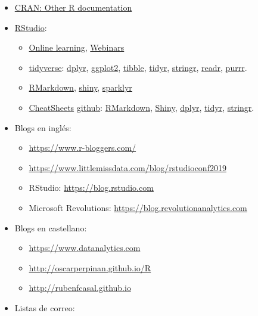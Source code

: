 \documentclass[
]{book}
\theoremstyle{break}
\theoremstyle{definition}
\theoremstyle{definition}
\theoremstyle{definition}
\theoremstyle{remark}
\begin{document}
\begin{itemize}
\item
  \href{https://www.r-project.org/other-docs.html}{CRAN: Other R documentation}
\item
  \href{https://www.rstudio.com}{RStudio}:

  \begin{itemize}
  \item
    \href{https://www.rstudio.com/online-learning}{Online learning},
    \href{https://resources.rstudio.com/webinars}{Webinars}
  \item
    \href{https://www.tidyverse.org}{tidyverse}:
    \href{https://dplyr.tidyverse.org}{dplyr},
    \href{https://ggplot2.tidyverse.org}{ggplot2},
    \href{https://tibble.tidyverse.org}{tibble},
    \href{https://tidyr.tidyverse.org}{tidyr},
    \href{https://stringr.tidyverse.org}{stringr},
    \href{https://readr.tidyverse.org}{readr},
    \href{https://purrr.tidyverse.org}{purrr}.
  \item
    \href{https://rmarkdown.rstudio.com}{RMarkdown}, \href{http://shiny.rstudio.com}{shiny}, \href{https://spark.rstudio.com}{sparklyr}
  \item
    \href{https://resources.rstudio.com/rstudio-cheatsheets}{CheatSheets} \href{https://github.com/rstudio/cheatsheets}{github}:
    \href{https://github.com/rstudio/cheatsheets/raw/master/rmarkdown-2.0.pdf}{RMarkdown},
    \href{https://github.com/rstudio/cheatsheets/raw/master/shiny.pdf}{Shiny},
    \href{https://github.com/rstudio/cheatsheets/raw/master/data-transformation.pdf}{dplyr},
    \href{https://github.com/rstudio/cheatsheets/raw/master/data-import.pdf}{tidyr},
    \href{https://github.com/rstudio/cheatsheets/raw/master/stringr-cheat-sheet.pdf}{stringr}.
  \end{itemize}
\item
  Blogs en inglés:

  \begin{itemize}
  \item
    \url{https://www.r-bloggers.com/}
  \item
    \url{https://www.littlemissdata.com/blog/rstudioconf2019}
  \item
    RStudio: \url{https://blog.rstudio.com}
  \item
    Microsoft Revolutions: \url{https://blog.revolutionanalytics.com}
  \end{itemize}
\item
  Blogs en castellano:

  \begin{itemize}
  \item
    \url{https://www.datanalytics.com}
  \item
    \url{http://oscarperpinan.github.io/R}
  \item
    \url{http://rubenfcasal.github.io}
  \end{itemize}
\item
  Listas de correo:


\end{itemize}
\end{document}
